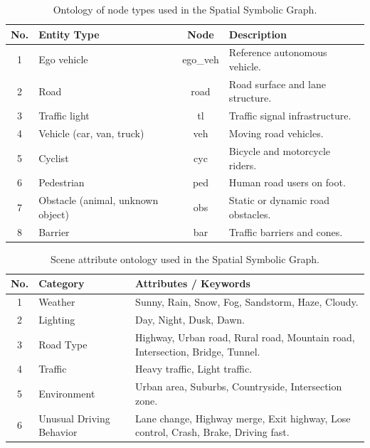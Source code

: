 \documentclass[a4paper, 11pt]{article} %
\begin{document}
\begin{table}[H]
\centering
\renewcommand{\arraystretch}{1.2}

\begin{tabularx}{\textwidth}{|c|l|>{\ttfamily}c|X|}
\hline
\textbf{No.} & \textbf{Entity Type} & \textbf{Node} & \textbf{Description} \\
\hline
1 & Ego vehicle & ego\_veh & Reference autonomous vehicle. \\ \hline
2 & Road & road & Road surface and lane structure. \\ \hline
3 & Traffic light & tl & Traffic signal infrastructure. \\ \hline
4 & Vehicle (car, van, truck) & veh & Moving road vehicles. \\ \hline
5 & Cyclist & cyc & Bicycle and motorcycle riders. \\ \hline
6 & Pedestrian & ped & Human road users on foot. \\ \hline
7 & Obstacle (animal, unknown object) & obs & Static or dynamic road obstacles. \\ \hline
8 & Barrier & bar & Traffic barriers and cones. \\ \hline
\end{tabularx}

\caption{Ontology of node types used in the Spatial Symbolic Graph.}
\label{tab:node_ontology}
\end{table}
\begin{table}[H]
\centering
\renewcommand{\arraystretch}{1.2}

\begin{tabularx}{\textwidth}{|c|l|X|}
\hline
\textbf{No.} & \textbf{Category} & \textbf{Attributes / Keywords} \\
\hline

1 & Weather &
Sunny, Rain, Snow, Fog, Sandstorm, Haze, Cloudy. \\
\hline

2 & Lighting &
Day, Night, Dusk, Dawn. \\
\hline

3 & Road Type &
Highway, Urban road, Rural road, Mountain road, Intersection, Bridge, Tunnel. \\
\hline

4 & Traffic &
Heavy traffic, Light traffic. \\
\hline

5 & Environment &
Urban area, Suburbs, Countryside, Intersection zone. \\
\hline

6 & Unusual Driving Behavior &
Lane change, Highway merge, Exit highway, Lose control, Crash, Brake, Driving fast. \\
\hline

\end{tabularx}

\caption{Scene attribute ontology used in the Spatial Symbolic Graph.}
\label{tab:scene_attribute}
\end{table}
\end{document}

